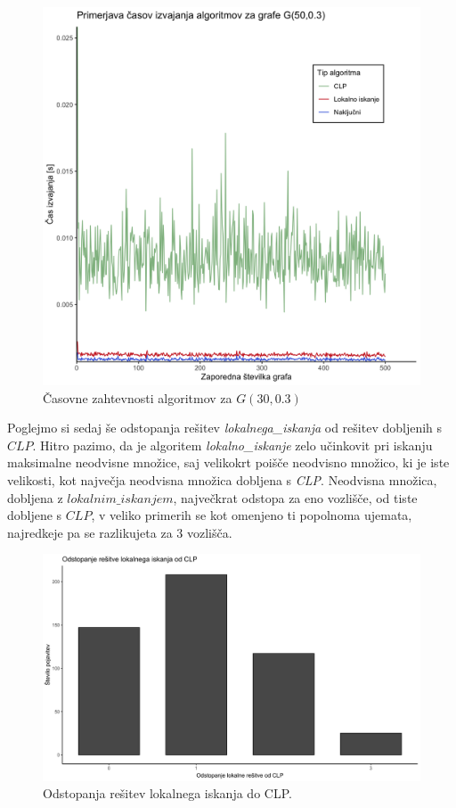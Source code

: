 \documentclass[a4paper, 12pt]{article}
\begin{document}
\begin{figure}[h!]
	\begin{center}
		\includegraphics[scale=0.11]{R_koda/pon-casi.png}
		\caption{Časovne zahtevnosti algoritmov za $G(30, 0.3)$}
	\end{center}
\end{figure}

\noindent Poglejmo si sedaj še odstopanja rešitev \textit{lokalnega\_iskanja} od rešitev dobljenih s $CLP$. Hitro pazimo, da je algoritem \textit{lokalno\_iskanje} zelo učinkovit pri iskanju maksimalne neodvisne množice, saj velikokrt 
poišče neodvisno množico, ki je iste velikosti, kot največja neodvisna množica dobljena s \textit{CLP}. Neodvisna množica, dobljena z  $lokalnim\_iskanjem$, največkrat odstopa za eno vozlišče, od tiste dobljene s $CLP$, 
v veliko primerih se kot omenjeno ti popolnoma ujemata, najredkeje pa se razlikujeta za 3 vozlišča.

\begin{figure}[h!]
	\begin{center}
		\includegraphics[scale=0.10]{R_koda/pon-napake.png}
		\caption{Odstopanja rešitev lokalnega iskanja do CLP.}
	\end{center}
\end{figure}
\end{document}
